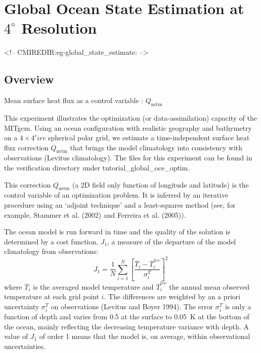 
\section[Global Ocean State Estimation Example]{Global Ocean State Estimation at $4^\circ$ Resolution}
\label{www:tutorials}
\label{sect:eg-global_state_estimate}
\begin{rawhtml}
<!-- CMIREDIR:eg-global_state_estimate: -->
\end{rawhtml}

\subsection{Overview}

Mean surface heat flux as a  control variable : $Q_\mathrm{netm}$

This experiment illustrates the optimization (or data-assimilation) capacity
of the MITgcm. Using an ocean configuration with realistic geography and bathymetry on a
$4\times4^circ$ spherical polar grid, we estimate a time-independent surface heat flux correction
$Q_\mathrm{netm}$ that brings the model climatology into consistency with observations (Levitus
climatology). The files for this experiment can be found in the verification directory under
tutorial\_global\_oce\_optim.

This correction $Q_\mathrm{netm}$ (a 2D field only function of longitude and latitude) is
the control variable of an optimization problem. It is inferred by an iterative
procedure using an `adjoint technique' and a least-squares method (see, for example, 
Stammer et al. (2002) and Ferreira et al. (2005)).

The ocean model is run forward in time and the quality of the solution is
determined by a cost function, $J_1$, a measure of the departure of the model
climatology from observations:
\begin{equation}
J_1=\frac{1}{N}\sum_{i=1}^N \left[ \frac{\overline{T}_i-\overline{T}_i^{lev}}{\sigma_i^T}\right]^2
\end{equation}
where $\overline{T}_i$ is the averaged model temperature and $\overline{T}_i^{lev}$
the annual mean observed temperature at each grid point $i$. The differences
are weighted by an a priori uncertainty $\sigma_i^T$ on observations (Levitus
and Boyer 1994). The error $\sigma_i^T$ is only a function of depth and varies
from 0.5 at the surface to 0.05~K at the bottom of the ocean, mainly reflecting
the decreasing temperature variance with depth. A value of $J_1$ of order 1 means
that the model is, on average, within observational uncertainties.


